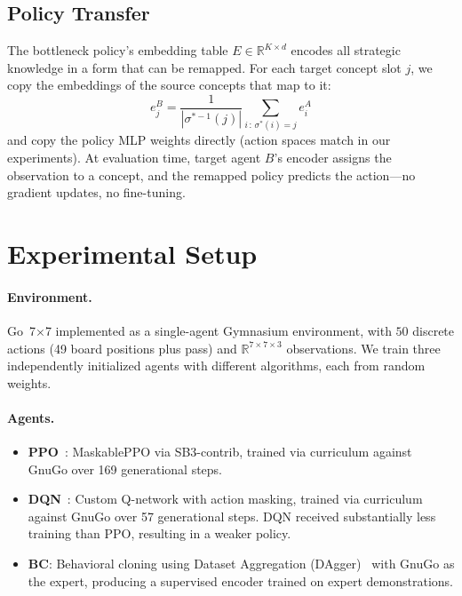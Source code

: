 \documentclass[11pt,a4paper]{article}
\begin{document}
\subsection{Policy Transfer}
\label{sec:transfer}

The bottleneck policy's embedding table $E \in \mathbb{R}^{K \times d}$ encodes all strategic knowledge in a form that can be remapped. For each target concept slot $j$, we copy the embeddings of the source concepts that map to it:
\[
e_j^B = \frac{1}{|\sigma^{*-1}(j)|} \sum_{i \,:\, \sigma^*(i)=j} e_i^A
\]
and copy the policy MLP weights directly (action spaces match in our experiments). At evaluation time, target agent $B$'s encoder assigns the observation to a concept, and the remapped policy predicts the action---no gradient updates, no fine-tuning.

\section{Experimental Setup}
\label{sec:setup}

\paragraph{Environment.} Go~7$\times$7 implemented as a single-agent Gymnasium environment, with $50$ discrete actions (49 board positions plus pass) and $\mathbb{R}^{7\times7\times3}$ observations. We train three independently initialized agents with different algorithms, each from random weights.

\paragraph{Agents.}
\begin{itemize}[leftmargin=*]
    \item \textbf{PPO}~\citep{schulman2017proximal}: MaskablePPO via SB3-contrib, trained via curriculum against GnuGo over 169 generational steps.
    \item \textbf{DQN}~\citep{mnih2015human}: Custom Q-network with action masking, trained via curriculum against GnuGo over 57 generational steps. DQN received substantially less training than PPO, resulting in a weaker policy.
    \item \textbf{BC}: Behavioral cloning using Dataset Aggregation (DAgger)~\citep{ross2011reduction} with GnuGo as the expert, producing a supervised encoder trained on expert demonstrations.
\end{itemize}
\end{document}
